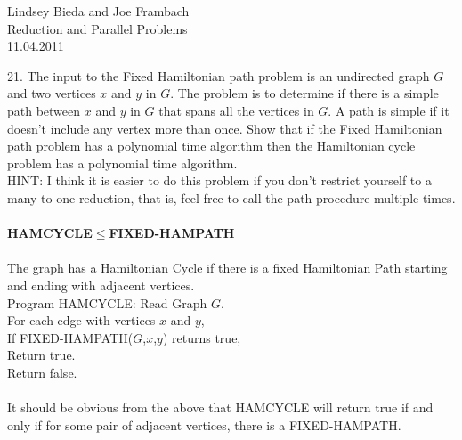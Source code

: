\documentclass[10pt]{article}
\newcommand{\tab}{\hspace*{2em}}
\newcommand{\tabb}{\hspace*{4em}}
\newcommand{\tabbb}{\hspace*{6em}}
\begin{document}
	\begin{flushright}
	Lindsey Bieda and Joe Frambach\\
	Reduction and Parallel Problems\\
	11.04.2011
	\end{flushright}

21. The input to the Fixed Hamiltonian path problem is an undirected graph $G$ and two vertices $x$ and $y$
in $G$. The problem is to determine if there is a simple path between $x$ and $y$ in $G$ that spans all the
vertices in $G$. A path is simple if it doesn't include any vertex more than once. Show that if the Fixed
Hamiltonian path problem has a polynomial time algorithm then the Hamiltonian cycle problem has
a polynomial time algorithm.\\
HINT: I think it is easier to do this problem if you don't restrict yourself to a many-to-one reduction,
that is, feel free to call the path procedure multiple times.\\
\\
\textbf{HAMCYCLE}$\leq$\textbf{FIXED-HAMPATH}\\
\\
The graph has a Hamiltonian Cycle if there is a fixed Hamiltonian Path starting and ending with adjacent vertices.\\
Program HAMCYCLE:
\tab Read Graph $G$.\\
\tab For each edge with vertices $x$ and $y$,\\
\tabb If FIXED-HAMPATH($G$,$x$,$y$) returns true,\\
\tabbb Return true.\\
\tab Return false.\\
\\
It should be obvious from the above that HAMCYCLE will return true if and only if for some pair of adjacent vertices,
there is a FIXED-HAMPATH.
\end{document}
